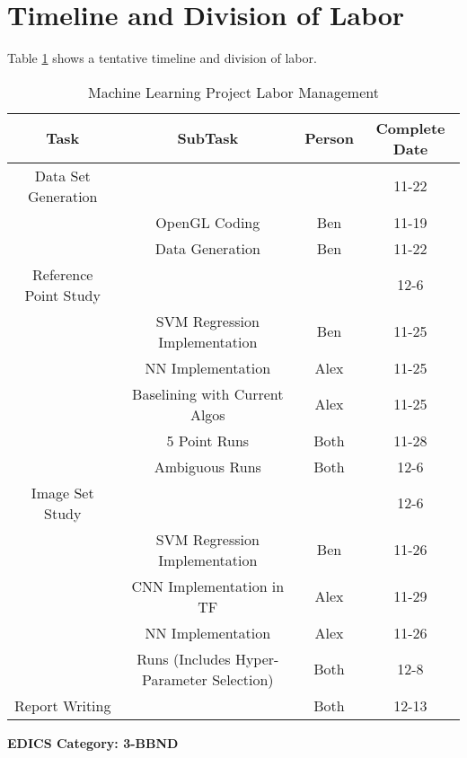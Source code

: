 \documentclass[journal]{IEEEtran}
\begin{document}
\section{Timeline and Division of Labor}

Table \ref{SomeTable} shows a tentative timeline and division of labor.

\begin{table}[h]
\caption{Machine Learning Project Labor Management}
\label{SomeTable}
\centering
\begin{tabular}{|c|c|c|c|}
\hline
Task & SubTask & Person & Complete Date\\
\hline
Data Set Generation &  & & 11-22\\
& OpenGL Coding & Ben & 11-19\\
& Data Generation & Ben & 11-22\\
Reference Point Study & & & 12-6\\
& SVM Regression Implementation & Ben & 11-25\\
& NN Implementation & Alex & 11-25\\
& Baselining with Current Algos & Alex & 11-25\\
& 5 Point Runs & Both & 11-28\\
& Ambiguous Runs & Both & 12-6\\
Image Set Study & & & 12-6\\
& SVM Regression Implementation & Ben & 11-26\\
& CNN Implementation in TF & Alex & 11-29\\
& NN Implementation & Alex & 11-26\\
& Runs (Includes Hyper-Parameter Selection) & Both & 12-8\\
Report Writing & & Both & 12-13\\
\hline


\end{tabular}
\end{table}


 \ifCLASSOPTIONpeerreview
 \begin{center} \bfseries EDICS Category: 3-BBND \end{center}
 \fi



\IEEEpeerreviewmaketitle




   
\end{document}
